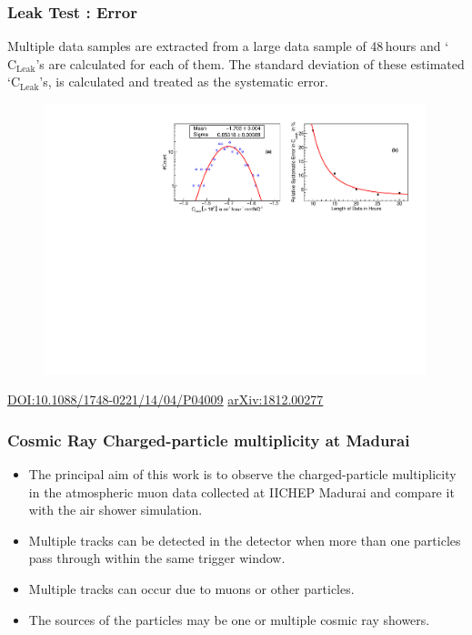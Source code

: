 \documentclass{beamer}
\begin{document}
\begin{frame}
  \frametitle{Leak Test : Error}
  Multiple data samples are extracted from a large data sample of
  48\,hours and `$\textrm{C}_{\textrm{Leak}}$'s are calculated for each
  of them. The standard deviation of these estimated
  `$\textrm{C}_{\textrm{Leak}}$'s, is calculated and treated as the
  systematic error. 
  \begin{figure}[!h]
    \vspace{-8pt}
    \includegraphics[width=0.99\textwidth]{splitDataLeak.pdf}
    \vspace{-8pt}
  \end{figure}
  \vspace{20pt}
  \href{https://doi.org/10.1088/1748-0221/14/04/P04009}{DOI:10.1088/1748-0221/14/04/P04009} \hspace{10pt} \href{https://arxiv.org/abs/1812.00277}{arXiv:1812.00277}
\end{frame}



\begin{frame}
  \frametitle{Cosmic Ray Charged-particle multiplicity at Madurai}
  \begin{itemize} %
  \item The principal aim of this work is to observe the charged-particle multiplicity in the atmospheric muon data collected at IICHEP Madurai and compare it with the air shower simulation.
  \item Multiple tracks can be detected in the detector when more than one particles pass through within the same trigger window.
  \item Multiple tracks can occur due to muons or other particles.
  \item The sources of the particles may be one or multiple cosmic ray showers.
  \end{itemize}
\end{frame}
\end{document}
